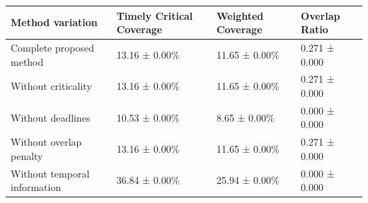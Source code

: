 \begin{tabular}{llll}
\toprule
Method variation & Timely Critical Coverage & Weighted Coverage & Overlap Ratio \\
\midrule
Complete proposed method & 13.16 ± 0.00\% & 11.65 ± 0.00\% & 0.271 ± 0.000 \\
Without criticality & 13.16 ± 0.00\% & 11.65 ± 0.00\% & 0.271 ± 0.000 \\
Without deadlines & 10.53 ± 0.00\% &  8.65 ± 0.00\% & 0.000 ± 0.000 \\
Without overlap penalty & 13.16 ± 0.00\% & 11.65 ± 0.00\% & 0.271 ± 0.000 \\
Without temporal information & 36.84 ± 0.00\% & 25.94 ± 0.00\% & 0.000 ± 0.000 \\
\bottomrule
\end{tabular}

